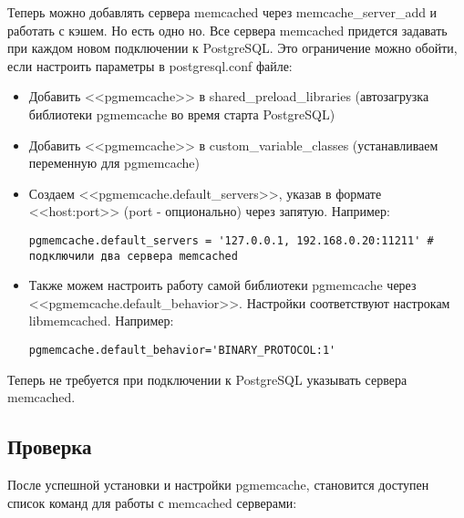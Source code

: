 Теперь можно добавлять сервера memcached через memcache\_server\_add и работать с кэшем. Но есть одно но. Все сервера memcached придется 
задавать при каждом новом подключении к PostgreSQL. 
Это ограничение можно обойти, если настроить параметры в postgresql.conf файле:
\begin{itemize}
\item Добавить <<pgmemcache>> в shared\_preload\_libraries (автозагрузка библиотеки pgmemcache во время старта PostgreSQL)
\item Добавить <<pgmemcache>> в custom\_variable\_classes (устанавливаем переменную для pgmemcache)
\item Создаем <<pgmemcache.default\_servers>>, указав в формате <<host:port>> (port - опционально) через запятую. Например:
\begin{lstlisting}[label=lst:pgcache6,caption=Настройка default\_servers]
pgmemcache.default_servers = '127.0.0.1, 192.168.0.20:11211' # подключили два сервера memcached
\end{lstlisting}
\item Также можем настроить работу самой библиотеки pgmemcache через <<pgmemcache.default\_behavior>>. 
Настройки соответствуют настрокам libmemcached. Например:
\begin{lstlisting}[label=lst:pgcache7,caption=Настройка pgmemcache]
pgmemcache.default_behavior='BINARY_PROTOCOL:1'
\end{lstlisting}
\end{itemize}

Теперь не требуется при подключении к PostgreSQL указывать сервера memcached.

\subsection{Проверка}
После успешной установки и настройки pgmemcache, становится доступен список команд для работы с memcached серверами:

